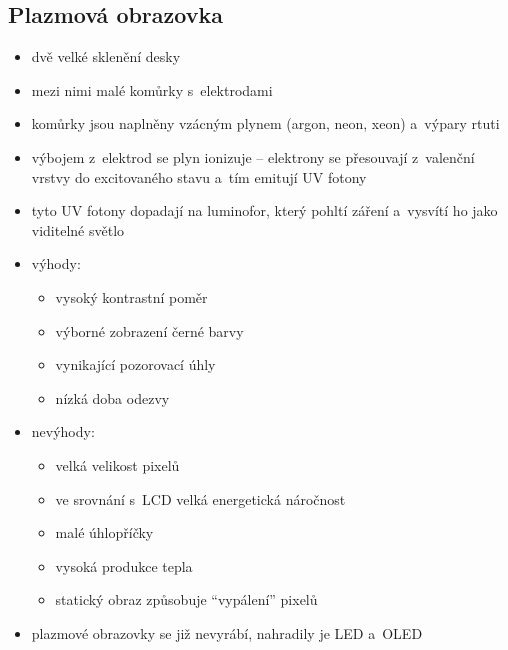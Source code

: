 \documentclass[a4paper,12pt]{article}
\providecommand{\tightlist}{%
\setlength{\itemsep}{0pt}\setlength{\parskip}{0pt}}
\begin{document}
\subsection{Plazmová obrazovka}

\begin{itemize}
  \tightlist
  \item dvě velké sklenění desky
  \item mezi nimi malé komůrky s~elektrodami
  \item komůrky jsou naplněny vzácným plynem (argon, neon, xeon) a~výpary rtuti
  \item výbojem z~elektrod se plyn ionizuje -- elektrony se přesouvají
  z~valenční vrstvy do excitovaného stavu a~tím emitují UV fotony
  \item tyto UV fotony dopadají na luminofor, který pohltí záření a~vysvítí ho
  jako viditelné světlo

  \item výhody:
  \begin{itemize}
    \tightlist
    \item vysoký kontrastní poměr
    \item výborné zobrazení černé barvy
    \item vynikající pozorovací úhly
    \item nízká doba odezvy
  \end{itemize}

  \item nevýhody:
  \begin{itemize}
    \tightlist
    \item velká velikost pixelů
    \item ve srovnání s~LCD velká energetická náročnost
    \item malé úhlopříčky
    \item vysoká produkce tepla
    \item statický obraz způsobuje ``vypálení'' pixelů
  \end{itemize}

  \item plazmové obrazovky se již nevyrábí, nahradily je LED a~OLED
\end{itemize}
\end{document}
